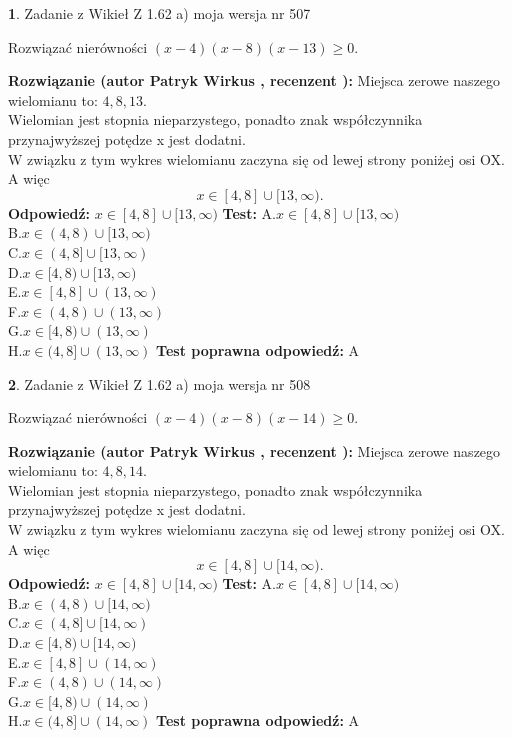 \documentclass[12pt, a4paper]{article}
\theoremstyle{definition} %
\newtheorem{zad}{}
\newcommand{\zadStart}[1]{\begin{zad}#1\newline}
\newcommand{\zadStop}{\end{zad}}
\newcommand{\rozwStart}[2]{\noindent \textbf{Rozwiązanie (autor #1 , recenzent #2): }\newline}
\newcommand{\rozwStop}{\newline}
\newcommand{\odpStart}{\noindent \textbf{Odpowiedź:}\newline}
\newcommand{\odpStop}{\newline}
\newcommand{\testStart}{\noindent \textbf{Test:}\newline}
\newcommand{\testStop}{\newline}
\newcommand{\kluczStart}{\noindent \textbf{Test poprawna odpowiedź:}\newline}
\newcommand{\kluczStop}{\newline}
\begin{document}
\zadStart{Zadanie z Wikieł Z 1.62 a) moja wersja nr 507}

Rozwiązać nierówności $(x-4)(x-8)(x-13)\ge0$.
\zadStop
\rozwStart{Patryk Wirkus}{}
Miejsca zerowe naszego wielomianu to: $4, 8, 13$.\\
Wielomian jest stopnia nieparzystego, ponadto znak współczynnika przy\linebreak najwyższej potędze x jest dodatni.\\ W związku z tym wykres wielomianu zaczyna się od lewej strony poniżej osi OX. A więc $$x \in [4,8] \cup [13,\infty).$$
\rozwStop
\odpStart
$x \in [4,8] \cup [13,\infty)$
\odpStop
\testStart
A.$x \in [4,8] \cup [13,\infty)$\\
B.$x \in (4,8) \cup [13,\infty)$\\
C.$x \in (4,8] \cup [13,\infty)$\\
D.$x \in [4,8) \cup [13,\infty)$\\
E.$x \in [4,8] \cup (13,\infty)$\\
F.$x \in (4,8) \cup (13,\infty)$\\
G.$x \in [4,8) \cup (13,\infty)$\\
H.$x \in (4,8] \cup (13,\infty)$
\testStop
\kluczStart
A
\kluczStop



\zadStart{Zadanie z Wikieł Z 1.62 a) moja wersja nr 508}

Rozwiązać nierówności $(x-4)(x-8)(x-14)\ge0$.
\zadStop
\rozwStart{Patryk Wirkus}{}
Miejsca zerowe naszego wielomianu to: $4, 8, 14$.\\
Wielomian jest stopnia nieparzystego, ponadto znak współczynnika przy\linebreak najwyższej potędze x jest dodatni.\\ W związku z tym wykres wielomianu zaczyna się od lewej strony poniżej osi OX. A więc $$x \in [4,8] \cup [14,\infty).$$
\rozwStop
\odpStart
$x \in [4,8] \cup [14,\infty)$
\odpStop
\testStart
A.$x \in [4,8] \cup [14,\infty)$\\
B.$x \in (4,8) \cup [14,\infty)$\\
C.$x \in (4,8] \cup [14,\infty)$\\
D.$x \in [4,8) \cup [14,\infty)$\\
E.$x \in [4,8] \cup (14,\infty)$\\
F.$x \in (4,8) \cup (14,\infty)$\\
G.$x \in [4,8) \cup (14,\infty)$\\
H.$x \in (4,8] \cup (14,\infty)$
\testStop
\kluczStart
A
\kluczStop
\end{document}
